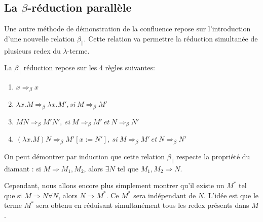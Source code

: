 \subsection{La $\beta$-réduction parallèle}
Une autre méthode de démonstration de la confluence repose sur l'introduction d'une nouvelle relation $\beta _\parallel $.
Cette relation va permettre la réduction simultanée de plusieurs redex du $\lambda$-terme.

\begin{definition}
	La $\beta _\parallel$ réduction repose sur les 4 règles suivantes:
	\begin{enumerate}
		\item  
		$ x \Rightarrow_\beta  x $
		\item 
		$ \lambda x.M \Rightarrow_\beta  \lambda x.M' , si\ M \Rightarrow_\beta  M' $
		\item 
		$ MN \Rightarrow_\beta  M' N' , \ si\ M  \Rightarrow_\beta  M' 
		                                               \ et\ N  \Rightarrow_\beta  N'$
		\item 
		$ (\lambda x.M)N \Rightarrow_\beta M'[x:=N'] , \ si\ M \Rightarrow_\beta  M' 
		                                               \ et\ N  \Rightarrow_\beta N'$
	\end{enumerate}

\end{definition}
On peut démontrer par induction que cette relation $\beta _\parallel$ respecte la propriété du diamant : si
$M \Rightarrow M_1,M_2$, alors $\exists N$ tel que $M_1,M_2  \Rightarrow N$.

Cependant, nous allons encore plus simplement montrer qu'il existe un $M^*$ tel que si $M  \Rightarrow N  \forall N$, alors
$N  \Rightarrow M^*$. Ce $M^*$ sera indépendant de $N$.
L'idée est que le terme $M^*$ sera obtenu en réduisant simultanément tous les redex présents dans $M$.


